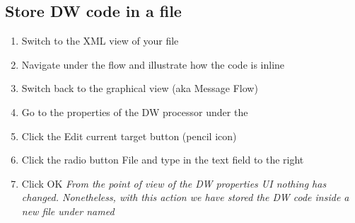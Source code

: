 \subsection{Store DW code in a file}
\begin{enumerate}
\item Switch to the XML view of your file
\item Navigate under the  flow and illustrate how the code is inline
\item Switch back to the graphical view (aka Message Flow)
\item Go to the properties of the DW processor under the 
\item Click the Edit current target button (pencil icon)
\item Click the radio button File and type  in the text field to the right
\item Click OK
  \emph {
    From the point of view of the DW properties UI nothing has changed.  Nonetheless, with this action we have stored the DW code inside a new file under  named 
  }
\end{enumerate}

